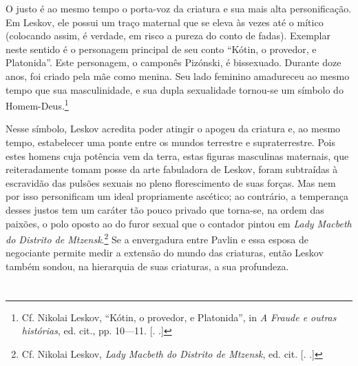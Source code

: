 O justo é ao mesmo tempo o porta-voz da criatura e sua mais alta
personificação. Em Leskov, ele possui um traço maternal que se eleva às
vezes até o mítico (colocando assim, é verdade, em risco a pureza do
conto de fadas). Exemplar neste sentido é o personagem principal de seu
conto ``Kótin, o provedor, e Platonida''. Este personagem, o camponês
Pizónski, é bissexuado. Durante doze anos, foi criado pela mãe como
menina. Seu lado feminino amadureceu ao mesmo tempo que sua
masculinidade, e sua dupla sexualidade tornou-se um símbolo do
Homem-Deus.\footnote{Cf. Nikolai Leskov, ``Kótin, o provedor, e
  Platonida'', in \emph{A Fraude e outras histórias}, ed. cit., pp.
  10---11. [. .]}

Nesse símbolo, Leskov acredita poder atingir o apogeu da criatura e, ao
mesmo tempo, estabelecer uma ponte entre os mundos terrestre e
supraterrestre. Pois estes homens cuja potência vem da terra, estas
figuras masculinas maternais, que reiteradamente tomam posse da arte
fabuladora de Leskov, foram subtraídas à escravidão das pulsões sexuais
no pleno florescimento de suas forças. Mas nem por isso personificam um
ideal propriamente ascético; ao contrário, a temperança desses justos
tem um caráter tão pouco privado que torna-se, na ordem das paixões, o
polo oposto ao do furor sexual que o contador pintou em \emph{Lady
Macbeth do Distrito de Mtzensk}.\footnote{Cf. Nikolai Leskov, \emph{Lady
  Macbeth do Distrito de Mtzensk}, ed. cit. [. .]} Se a
envergadura entre Pavlin e essa esposa de negociante permite medir a
extensão do mundo das criaturas, então Leskov também sondou, na
hierarquia de suas criaturas, a sua profundeza.

\section{}

